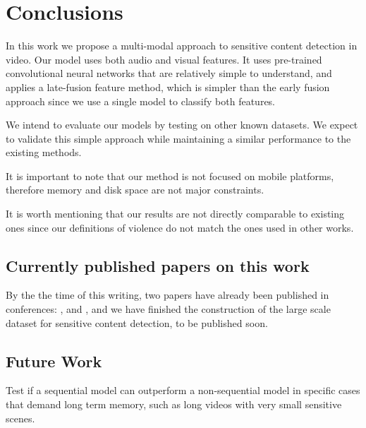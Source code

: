 \newpage

\chapter{Conclusions}
\label{chap:conclusions}

In this work we propose a multi-modal approach to sensitive content detection in video. Our model uses both audio and visual features. It uses pre-trained convolutional neural networks that are relatively simple to understand, and  applies a late-fusion feature method, which is simpler than the early fusion approach since we use a single model to classify both features.

We intend to evaluate our models by testing on other known datasets. We expect to validate this simple approach while maintaining a similar performance to the existing methods.

It is important to note that our method is not focused on mobile platforms, therefore memory and disk space are not major constraints. 

It is worth mentioning that our results are not directly comparable to existing ones since our definitions of violence do not match the ones used in other works. 

\section{Currently published papers on this work}
\label{sec:contrib}

By the the time of this writing, two papers have already been published in  conferences: \cite{2019NSFWbaseline}, and \cite{2020PornDetectionSBIE}, and we have finished the construction of the large scale dataset for sensitive content detection, to be published soon.

\section{Future Work}
\label{sec:future}


         
Test if a sequential model can outperform a non-sequential model in specific cases that demand long term memory, such as long videos with very small sensitive scenes.
